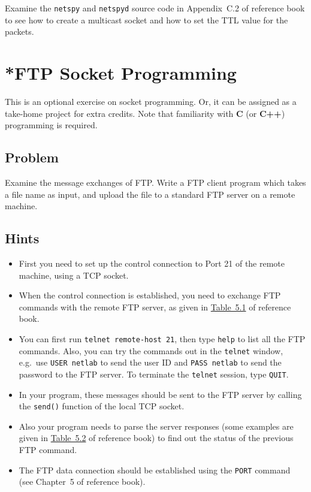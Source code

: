 \documentclass{../UTNetLab}
\begin{document}
    Examine the \lstinline{netspy} and \lstinline{netspyd} source code in Appendix~C.2 of reference book to see how to create a multicast socket and how to set the TTL value for the packets.
    

\section{*FTP Socket Programming}
    This is an optional exercise on socket programming.
    Or, it can be assigned as a take-home project for extra credits.
    Note that familiarity with \textbf{C} (or \textbf{C++}) programming is required.

    \subsection*{Problem}
    Examine the message exchanges of FTP.
    Write a FTP client program which takes a file name as input, and upload the file to a standard FTP server on a remote machine.

    \subsection*{Hints}
    \begin{itemize}
        \item First you need to set up the control connection to Port 21 of the remote machine, using a TCP socket.
        \item When the control connection is established, you need to exchange FTP commands with the remote FTP server, as given in \hyperref[tab:5.1]{Table~5.1} of reference book.
        \item You can first run \lstinline[emph={remote-host}]{telnet remote-host 21}, then type \lstinline{help} to list all the FTP commands.
        Also, you can try the commands out in the \lstinline{telnet} window, e.g.\ use \lstinline[emph={netlab},morekeywords={[2]USER}]{USER netlab} to send the user ID and \lstinline[emph={netlab},morekeywords={[2]PASS}]{PASS netlab} to send the password to the FTP server.
        To terminate the \lstinline{telnet} session, type \lstinline[morekeywords={[2]QUIT}]{QUIT}.
        \item In your program, these messages should be sent to the FTP server by calling the \lstinline{send()} function of the local TCP socket.
        \item Also your program needs to parse the server responses (some examples are given in \hyperref[tab:5.2]{Table~5.2} of reference book) to find out the status of the previous FTP command.
        \item The FTP data connection should be established using the \lstinline[morekeywords={[2]PORT}]{PORT} command (see Chapter~5 of reference book).
    \end{itemize}
\end{document}
